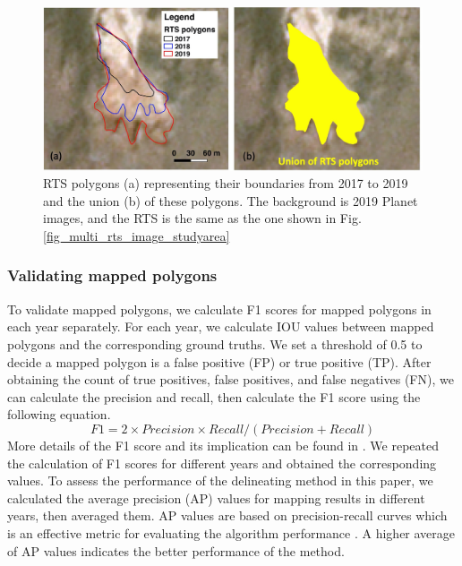 \documentclass[authoryear,preprint,review,12pt]{elsarticle}
\begin{document}
\begin{figure} 
	\centering
	\includegraphics[width=14cm]{figs/rts_expanding_example_trim.jpg}
	\caption{RTS polygons (a) representing their boundaries from 2017 to 2019 and the union (b) of these polygons. The background is 2019 Planet images, and the RTS is the same as the one shown in Fig. \ref{fig_multi_rts_image_studyarea}}
	\label{fig_rts_expanding}
\end{figure}


\subsubsection{Validating mapped polygons}
\label{sec_validate_mapped_polygons}

To validate mapped polygons, we calculate F1 scores for mapped polygons in each year separately. 
For each year, we calculate IOU values between mapped polygons and the corresponding ground truths. 
We set a threshold of 0.5 to decide a mapped polygon is a false positive (FP) or true positive (TP).
After obtaining the count of true positives, false positives, and false negatives (FN), we can calculate the precision and recall, then calculate the F1 score using the following equation. 
\begin{equation}
F1=2 \times Precision \times Recall / (Precision + Recall)
\label{equ_f1score}
\end{equation}
More details of the F1 score and its implication can be found in \cite{huang2020using}.
We repeated the calculation of F1 scores for different years and obtained the corresponding values. 
To assess the performance of the delineating method in this paper, we calculated the average precision (AP) values for mapping results in different years, then averaged them. 
AP values are based on precision-recall curves which is an effective metric for evaluating the algorithm performance \citep{huang2020using}.
A higher average of AP values indicates the better performance of the method. 
\end{document}
